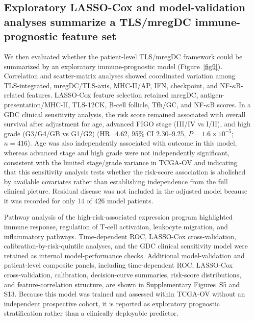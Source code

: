 \documentclass[cancers,article,submit,pdftex,moreauthors]{Definitions/mdpi}
\begin{document}
\subsection{Exploratory LASSO-Cox and model-validation analyses summarize a TLS/mregDC immune-prognostic feature set}

We then evaluated whether the patient-level TLS/mregDC framework could be summarized by an exploratory immune-prognostic model (Figure~\ref{fig9}). Correlation and scatter-matrix analyses showed coordinated variation among TLS-integrated, mregDC/TLS-axis, MHC-II/AP, IFN, checkpoint, and NF-$\kappa$B-related features. LASSO-Cox feature selection retained mregDC, antigen-presentation/MHC-II, TLS-12CK, B-cell follicle, Tfh/GC, and NF-$\kappa$B scores. In a GDC clinical sensitivity analysis, the risk score remained associated with overall survival after adjustment for age, advanced FIGO stage (III/IV vs I/II), and high grade (G3/G4/GB vs G1/G2) (HR=4.62, 95\% CI 2.30--9.25, $P=1.6\times10^{-5}$; $n=416$). Age was also independently associated with outcome in this model, whereas advanced stage and high grade were not independently significant, consistent with the limited stage/grade variance in TCGA-OV and indicating that this sensitivity analysis tests whether the risk-score association is abolished by available covariates rather than establishing independence from the full clinical picture. Residual disease was not included in the adjusted model because it was recorded for only 14 of 426 model patients.

Pathway analysis of the high-risk-associated expression program highlighted immune response, regulation of T-cell activation, leukocyte migration, and inflammatory pathways. Time-dependent ROC, LASSO-Cox cross-validation, calibration-by-risk-quintile analyses, and the GDC clinical sensitivity model were retained as internal model-performance checks. Additional model-validation and patient-level composite panels, including time-dependent ROC, LASSO-Cox cross-validation, calibration, decision-curve summaries, risk-score distributions, and feature-correlation structure, are shown in Supplementary Figures~S5 and S13. Because this model was trained and assessed within TCGA-OV without an independent prospective cohort, it is reported as exploratory prognostic stratification rather than a clinically deployable predictor.
\end{document}
